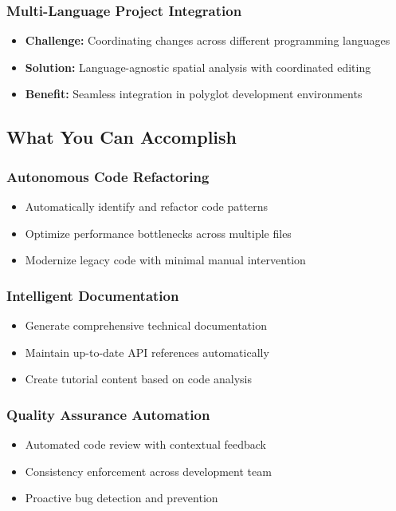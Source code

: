 \documentclass[12pt,a4paper]{article}
\begin{document}
\subsubsection{Multi-Language Project Integration}
\begin{itemize}
    \item \textbf{Challenge:} Coordinating changes across different programming languages
    \item \textbf{Solution:} Language-agnostic spatial analysis with coordinated editing
    \item \textbf{Benefit:} Seamless integration in polyglot development environments
\end{itemize}

\subsection{What You Can Accomplish}

\subsubsection{Autonomous Code Refactoring}
\begin{itemize}
    \item Automatically identify and refactor code patterns
    \item Optimize performance bottlenecks across multiple files
    \item Modernize legacy code with minimal manual intervention
\end{itemize}

\subsubsection{Intelligent Documentation}
\begin{itemize}
    \item Generate comprehensive technical documentation
    \item Maintain up-to-date API references automatically
    \item Create tutorial content based on code analysis
\end{itemize}

\subsubsection{Quality Assurance Automation}
\begin{itemize}
    \item Automated code review with contextual feedback
    \item Consistency enforcement across development team
    \item Proactive bug detection and prevention
\end{itemize}
\end{document}
